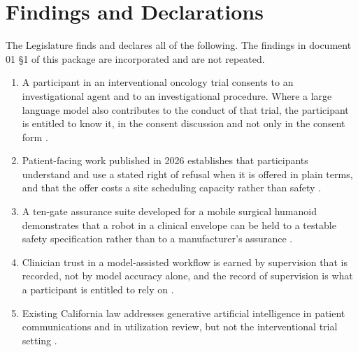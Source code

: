 
\section{Findings and Declarations}

The Legislature finds and declares all of the following. The findings in
document 01 §1 of this package are incorporated and are not repeated.

\begin{enumerate}
\item A participant in an interventional oncology trial consents to an
  investigational agent and to an investigational procedure. Where a large
  language model also contributes to the conduct of that trial, the participant
  is entitled to know it, in the consent discussion and not only in the consent
  form \cite{cfr50adapt}.

\item Patient-facing work published in 2026 establishes that participants
  understand and use a stated right of refusal when it is offered in plain
  terms, and that the offer costs a site scheduling capacity rather than safety
  \cite{patientadvocacy,patientinstructions2026}.

\item A ten-gate assurance suite developed for a mobile surgical humanoid
  demonstrates that a robot in a clinical envelope can be held to a testable
  safety specification rather than to a manufacturer's assurance
  \cite{h2humanoid}.

\item Clinician trust in a model-assisted workflow is earned by supervision that
  is recorded, not by model accuracy alone, and the record of supervision is
  what a participant is entitled to rely on \cite{cliniciantrust}.

\item Existing California law addresses generative artificial intelligence in
  patient communications and in utilization review, but not the interventional
  trial setting \cite{ab3030_2024,sb1120_2024}.


\end{enumerate}
